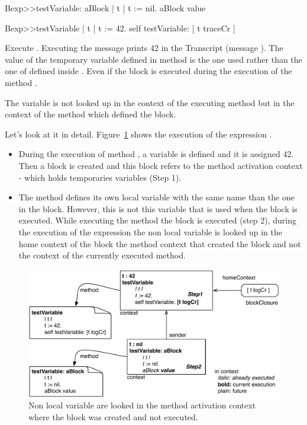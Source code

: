 \documentclass[a4paper,10pt,twoside]{book}
\begin{document}
\begin{code}{}
Bexp>>testVariable: aBlock
	| t |
	t := nil.
	aBlock value

Bexp>>testVariable
	| t |
	t := 42.
	self testVariable: [ t traceCr ]
\end{code}

Execute . Executing the  message  prints 42 in the Transcript (message ). The value of the temporary variable  defined in method  is the one used rather than the one of  defined inside . Even if the block is executed during the execution of the method .

The variable  is not looked up in the context of the executing method  but in the context of the method  which defined the block.

Let's look at it in detail. Figure~\ref{fig:variable} shows the execution of the expression . 

\begin{itemize}
\item During the execution of method , a variable  is defined and it is assigned 42. Then a block is created and this block refers to the method activation context - which holds temporaries variables (Step 1). 

\item The method  defines its own local variable  with the same name than the one in the block. However, this is not this variable that is used when the block is executed. While executing the method  the block is executed (step 2), during the execution of the expression  the non local variable  is looked up in the home context of the block \ie the method context that created the block and not the context of the currently executed method.
\end{itemize}

\begin{figure}[!h]
\begin{center}\includegraphics[width=\textwidth]{variable}
\caption{ Non local variable are looked in the method activation context where the block was created and not executed.\label{fig:variable}}
\end{center}
\end{figure}
\end{document}
